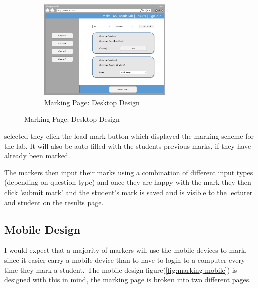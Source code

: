 \documentclass[11pt]{report}
\begin{document}
\begin{figure}
\vspace*{-\baselineskip}
\begin{figure}[H]
    \centering
    \includegraphics[width=0.7\textwidth]{images/design/marking-desktop.png}
    \caption{Marking Page: Desktop Design}
    \label{fig:design-marking-pc}
\end{figure}
\end{figure}

\noindent selected they click the load mark button which displayed the marking scheme for the lab. It will also be auto filled with the students previous marks, if they have already been marked.

The markers then input their marks using a combination of different input types (depending on question type) and once they are happy with the mark they then click 'submit mark' and the student's mark is saved and is visible to the lecturer and student on the results page.


\subsection*{Mobile Design}

I would expect that a majority of markers will use the mobile devices to mark, since it easier carry a mobile device than to have to login to a computer every time they mark a student. The mobile design figure(\ref{fig:marking-mobile}) is designed with this in mind, the marking page is broken into two different pages.
\end{document}
